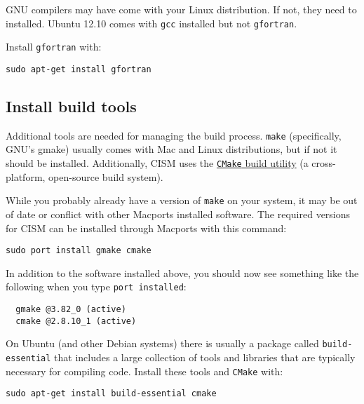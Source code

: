 \begin{mdframed}[style=ubuntu] %
GNU compilers may have come with your Linux distribution.  If not, they need to 
installed.  Ubuntu 12.10 comes with \texttt{gcc} installed but not \texttt{gfortran}.

Install \texttt{gfortran} with:

\texttt{sudo apt-get install gfortran}

\end{mdframed}                 %


\subsection{Install build tools}

Additional tools are needed for managing the build process.  \texttt{make} (specifically, GNU's gmake)
usually comes with Mac and Linux distributions, but if not it should be installed.  
Additionally, CISM uses the \href{http://www.cmake.org/}{\texttt{CMake} build utility}
(a cross-platform, open-source build system).

\begin{mdframed}[style=mac] %

While you probably already have a version of \texttt{make} on your system, it may be out of date or conflict with other Macports installed software. The required versions for CISM can be installed through Macports with this command: 

\begin{verbatim}
sudo port install gmake cmake
\end{verbatim}

In addition to the software installed above, you should now see something like the following when you type \texttt{port installed}:

\begin{verbatim}
  gmake @3.82_0 (active)
  cmake @2.8.10_1 (active)
\end{verbatim}
\end{mdframed}              %



\begin{mdframed}[style=ubuntu] %

On Ubuntu (and other Debian systems) there is usually a package called \texttt{build-essential} 
that includes a large collection of tools and libraries that are typically necessary
for compiling code. Install these tools and \texttt{CMake} with:

\texttt{sudo apt-get install build-essential cmake}
\end{mdframed}                 %


